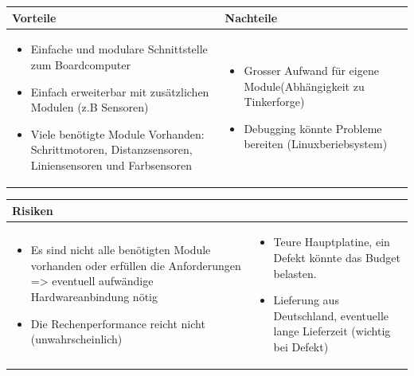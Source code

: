 \begin{table}[h]
\begin{tabular}{p{} | p{}}


\textbf{Vorteile} & \textbf{Nachteile} \\ \hline
	 
\begin{itemize}
\item Einfache und modulare Schnittstelle zum Boardcomputer
\item Einfach erweiterbar mit zusätzlichen Modulen (z.B Sensoren)
\item Viele benötigte Module Vorhanden: Schrittmotoren, Distanzsensoren, Liniensensoren und Farbsensoren
\end{itemize}
 &
\begin{itemize}
\item Grosser Aufwand für eigene Module(Abhängigkeit zu Tinkerforge)
\item Debugging könnte Probleme bereiten (Linuxberiebsystem) 
\end{itemize}
\end{tabular}
\end{table}


\begin{table}[h]
\begin{tabular}{p{}p{}}


 \textbf{Risiken} & \\ \hline
	 
\begin{itemize}
\item Es sind nicht alle benötigten Module vorhanden oder erfüllen die Anforderungen => eventuell aufwändige Hardwareanbindung nötig
\item Die Rechenperformance reicht nicht (unwahrscheinlich)
\end{itemize}
&
\begin{itemize}
\item Teure Hauptplatine, ein Defekt könnte das Budget belasten.
\item Lieferung aus Deutschland, eventuelle lange Lieferzeit (wichtig bei Defekt)
\end{itemize}

 
\end{tabular}
\end{table}

\pagebreak